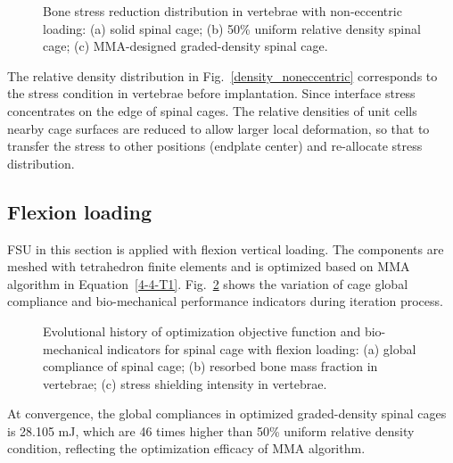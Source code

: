 \documentclass[12pt]{extbook}
\begin{document}
\begin{figure}[htbp]
\centering
{}
\caption{Bone stress reduction distribution in vertebrae with non-eccentric loading: (a) solid spinal cage; (b) 50\% uniform relative density spinal cage; (c) MMA-designed graded-density spinal cage.}
\label{mbr_noneccentric}
\end{figure}

The relative density distribution in Fig.~\ref{density_noneccentric} corresponds to the stress condition in vertebrae before implantation. Since interface stress concentrates on the edge of spinal cages. The relative densities of unit cells nearby cage surfaces are reduced to allow larger local deformation, so that to transfer the stress to other positions (endplate center) and re-allocate stress distribution.\\


\subsection{Flexion loading}

FSU in this section is applied with flexion vertical loading. The components are meshed with tetrahedron finite elements and is optimized based on MMA algorithm in Equation~\ref{4-4-T1}. Fig.~\ref{history_flexion} shows the variation of cage global compliance and bio-mechanical performance indicators during iteration process.\\

\begin{figure}[htbp]
\centering
{}
\caption{Evolutional history of optimization objective function and bio-mechanical indicators for spinal cage with flexion loading: (a) global compliance of spinal cage; (b) resorbed bone mass fraction in vertebrae; (c) stress shielding intensity in vertebrae.}
\label{history_flexion}
\end{figure}

At convergence, the global compliances in optimized graded-density spinal cages is 28.105 mJ, which are 46 times higher than 50\% uniform relative density condition, reflecting the optimization efficacy of MMA algorithm.\\
\end{document}
